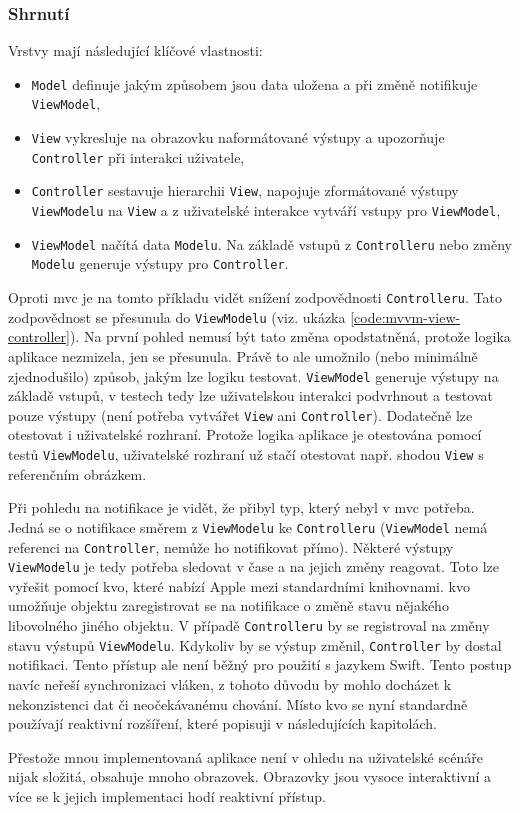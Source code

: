 \subsubsection*{Shrnutí} \label{architektura-mvvm-shrnuti}

Vrstvy mají následující klíčové vlastnosti:
\begin{itemize}
  \item \texttt{Model} definuje jakým způsobem jsou data uložena a při změně notifikuje \texttt{ViewModel},
  \item \texttt{View} vykresluje na obrazovku naformátované výstupy a upozorňuje \texttt{Controller} při interakci uživatele,
  \item \texttt{Controller} sestavuje hierarchii \texttt{View}, napojuje zformátované výstupy \texttt{ViewModelu} na \texttt{View} a z uživatelské interakce vytváří vstupy pro \texttt{ViewModel},
  \item \texttt{ViewModel} načítá data \texttt{Modelu}. Na základě vstupů z \texttt{Controlleru} nebo změny \texttt{Modelu} generuje výstupy pro \texttt{Controller}.
\end{itemize}

Oproti \acrshort{mvc} je na tomto příkladu vidět snížení zodpovědnosti \texttt{Controlleru}.
Tato zodpovědnost se přesunula do \texttt{ViewModelu} (viz. ukázka \ref{code:mvvm-view-controller}).
Na první pohled nemusí být tato změna opodstatněná, protože logika aplikace nezmizela, jen se přesunula.
Právě to ale umožnilo (nebo minimálně zjednodušilo) způsob, jakým lze logiku testovat.
\texttt{ViewModel} generuje výstupy na základě vstupů, v testech tedy lze uživatelskou interakci podvrhnout a testovat pouze výstupy (není potřeba vytvářet \texttt{View} ani \texttt{Controller}).
Dodatečně lze otestovat i uživatelské rozhraní.
Protože logika aplikace je otestována pomocí testů \texttt{ViewModelu}, uživatelské rozhraní už stačí otestovat např. shodou \texttt{View} s referenčním obrázkem.


Při pohledu na notifikace je vidět, že přibyl typ, který nebyl v \acrshort{mvc} potřeba.
Jedná se o notifikace směrem z \texttt{ViewModelu} ke \texttt{Controlleru} (\texttt{ViewModel} nemá referenci na \texttt{Controller}, nemůže ho notifikovat přímo).
Některé výstupy \texttt{ViewModelu} je tedy potřeba sledovat v čase a na jejich změny reagovat.
Toto lze vyřešit pomocí \acrfull{kvo}, které nabízí Apple mezi standardními knihovnami.
\acrshort{kvo} umožňuje objektu zaregistrovat se na notifikace o změně stavu nějakého libovolného jiného objektu.
V případě \texttt{Controlleru} by se registroval na změny stavu výstupů \texttt{ViewModelu}.
Kdykoliv by se výstup změnil, \texttt{Controller} by dostal notifikaci.
Tento přístup ale není běžný pro použití s jazykem Swift.
Tento postup navíc neřeší synchronizaci vláken, z tohoto důvodu by mohlo docházet k nekonzistenci dat či neočekávanému chování.
Místo \acrshort{kvo} se nyní standardně používají reaktivní rozšíření, které popisuji v následujících kapitolách.

Přestože mnou implementovaná aplikace není v ohledu na uživatelské scénáře nijak složitá, obsahuje mnoho obrazovek.
Obrazovky jsou vysoce interaktivní a více se k jejich implementaci hodí reaktivní přístup.
